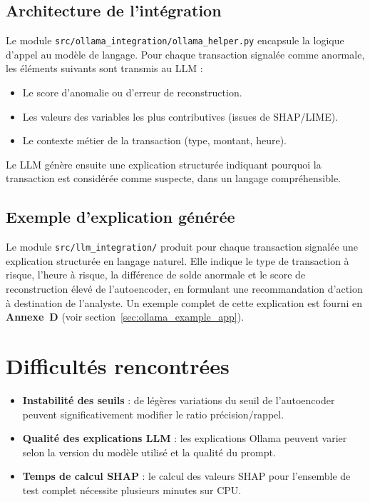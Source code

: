 \documentclass[12pt,a4paper,twoside]{report}
\begin{document}
\subsection{Architecture de l'intégration}

Le module \texttt{src/ollama\_integration/ollama\_helper.py} encapsule la logique d'appel au modèle de langage. Pour chaque transaction signalée comme anormale, les éléments suivants sont transmis au LLM :

\begin{itemize}
  \item Le score d'anomalie ou d'erreur de reconstruction.
  \item Les valeurs des variables les plus contributives (issues de SHAP/LIME).
  \item Le contexte métier de la transaction (type, montant, heure).
\end{itemize}

Le LLM génère ensuite une explication structurée indiquant pourquoi la transaction est considérée comme suspecte, dans un langage compréhensible.

\subsection{Exemple d'explication générée}

Le module \texttt{src/llm\_integration/} produit pour chaque transaction signalée une explication structurée en langage naturel. Elle indique le type de transaction à risque, l'heure à risque, la différence de solde anormale et le score de reconstruction élevé de l'autoencoder, en formulant une recommandation d'action à destination de l'analyste. Un exemple complet de cette explication est fourni en \textbf{Annexe~D} (voir section~\ref{sec:ollama_example_app}).

\section{Difficultés rencontrées}

\begin{itemize}
  \item \textbf{Instabilité des seuils} : de légères variations du seuil de l'autoencoder peuvent significativement modifier le ratio précision/rappel.
  \item \textbf{Qualité des explications LLM} : les explications Ollama peuvent varier selon la version du modèle utilisé et la qualité du prompt.
  \item \textbf{Temps de calcul SHAP} : le calcul des valeurs SHAP pour l'ensemble de test complet nécessite plusieurs minutes sur CPU.
\end{itemize}
\end{document}
